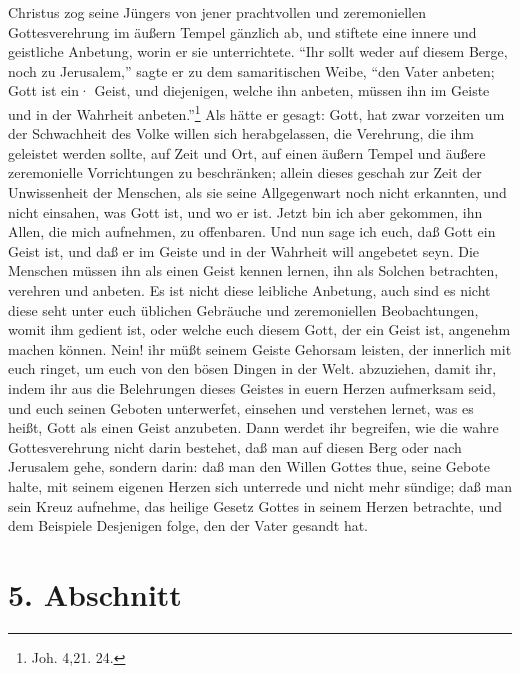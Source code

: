 Christus zog seine Jüngers von jener prachtvollen und zeremoniellen Gottesverehrung im äußern Tempel gänzlich ab, und stiftete eine innere und geistliche Anbetung, worin  er sie unterrichtete. "`Ihr sollt weder auf diesem Berge, noch zu Jerusalem,"' sagte er zu dem samaritischen Weibe, "`den Vater anbeten; Gott ist ein· Geist, und diejenigen, welche ihn anbeten, müssen ihn im Geiste und in der Wahrheit anbeten."'\footnote{Joh. 4,21. 24.}  Als hätte er gesagt: Gott, hat zwar vorzeiten um der Schwachheit des Volke willen sich herabgelassen, die Verehrung, die ihm geleistet werden sollte, auf Zeit und Ort, auf einen äußern Tempel und äußere zeremonielle Vorrichtungen zu beschränken; allein dieses geschah zur Zeit der Unwissenheit der Menschen, als sie seine Allgegenwart noch nicht erkannten, und nicht einsahen, was Gott ist, und wo er ist. Jetzt bin ich aber gekommen, ihn Allen, die mich aufnehmen, zu offenbaren. Und nun sage ich euch, daß Gott ein Geist ist, und daß er im Geiste und in der Wahrheit will angebetet seyn. Die Menschen müssen ihn als einen Geist kennen lernen, ihn als Solchen betrachten, verehren und anbeten. Es ist nicht diese leibliche Anbetung, auch sind es nicht diese seht unter euch üblichen Gebräuche und zeremoniellen Beobachtungen, womit ihm gedient ist, oder welche euch diesem Gott, der ein Geist ist, angenehm machen können. Nein! ihr müßt seinem Geiste Gehorsam leisten, der innerlich mit euch ringet, um euch von den bösen Dingen in der Welt. abzuziehen, damit ihr, indem ihr aus die Belehrungen dieses Geistes in euern Herzen aufmerksam seid, und euch seinen Geboten unterwerfet, einsehen und verstehen lernet, was es heißt, Gott als einen Geist anzubeten. Dann werdet ihr begreifen, wie die wahre Gottesverehrung nicht darin bestehet, daß man auf diesen Berg oder nach Jerusalem gehe, sondern darin: daß man den Willen Gottes thue, seine Gebote halte, mit seinem eigenen Herzen sich unterrede und nicht mehr sündige; daß man sein Kreuz aufnehme, das heilige Gesetz Gottes in seinem Herzen betrachte, und dem Beispiele Desjenigen folge, den der Vater gesandt hat.

\section{5. Abschnitt}

